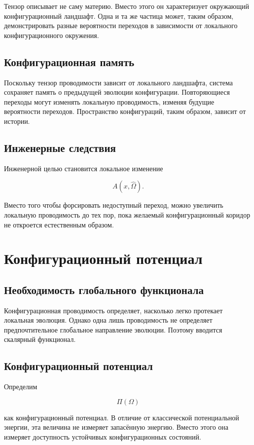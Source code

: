 Тензор описывает не саму материю. Вместо этого он характеризует окружающий конфигурационный ландшафт. Одна и та же частица может, таким образом, демонстрировать разные вероятности переходов в зависимости от локального конфигурационного окружения.

\section{Конфигурационная память}

Поскольку тензор проводимости зависит от локального ландшафта, система сохраняет память о предыдущей эволюции конфигурации. Повторяющиеся переходы могут изменять локальную проводимость, изменяя будущие вероятности переходов. Пространство конфигураций, таким образом, зависит от истории.

\section{Инженерные следствия}

Инженерной целью становится локальное изменение

\[ A(x,\hat{\Omega}). \]

Вместо того чтобы форсировать недоступный переход, можно увеличить локальную проводимость до тех пор, пока желаемый конфигурационный коридор не откроется естественным образом.

\chapter{Конфигурационный потенциал}

\section{Необходимость глобального функционала}

Конфигурационная проводимость определяет, насколько легко протекает локальная эволюция. Однако одна лишь проводимость не определяет предпочтительное глобальное направление эволюции. Поэтому вводится скалярный функционал.

\section{Конфигурационный потенциал}

Определим

\[ \boxed{ \Pi(\Omega) } \]

как конфигурационный потенциал. В отличие от классической потенциальной энергии, эта величина не измеряет запасённую энергию. Вместо этого она измеряет доступность устойчивых конфигурационных состояний.

